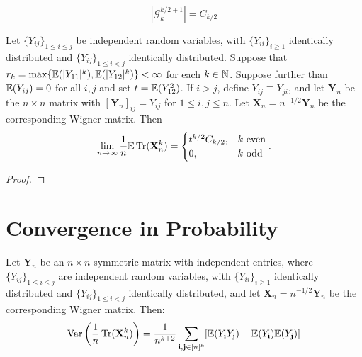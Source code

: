 \begin{proposition}
    \notready
    \label{prop:graph_Catalan_number}
  \[|\mathcal{G}^{k/2 + 1}_k| = C_{k/2}\]
\end{proposition}



%
%
%
%
%
%
%
%


\begin{proposition}
  \label{prop:matrix_moments_convergence}
  \notready
  Let $\{Y_{ij}\}_{1\le i\le j}$ be independent random variables, with $\{Y_{ii}\}_{i\ge 1}$ identically distributed and $\{Y_{ij}\}_{1\le i<j}$ identically distributed.  Suppose that $r_k = \max\{\mathbb{E}(|Y_{11}|^k),\mathbb{E}(|Y_{12}|^k)\} <\infty$ for each $k\in\mathbb{N}$.  Suppose further than $\mathbb{E}(Y_{ij})=0$ for all $i,j$ and set $t=\mathbb{E}(Y_{12}^2)$.  If $i>j$, define $Y_{ij} \equiv Y_{ji}$, and let $\mathbf{Y}_n$ be the $n\times n$ matrix with $[\mathbf{Y}_n]_{ij} = Y_{ij}$ for $1\le i,j\le n$.  Let $\mathbf{X}_n = n^{-1/2}\mathbf{Y}_n$ be the corresponding Wigner matrix.  Then
\[
\lim_{n\to\infty} \frac{1}{n}\mathbb{E}\operatorname{Tr}(\mathbf{X}_n^k) = \begin{cases}
  t^{k/2}C_{k/2}, & k\text{ even} \\
  0, & k\text{ odd}
\end{cases}.
\]
\end{proposition}

\begin{proof}
\notready
\end{proof}




\section{Convergence in Probability}


\begin{lemma}
    \label{lem:variance_expansion}
    \notready
    Let $\mathbf{Y}_{n}$ be an $n \times n$ symmetric matrix with independent entries, where $\{Y_{ij}\}_{1\le i\le j}$ are independent random variables, with $\{Y_{ii}\}_{i\ge 1}$ identically distributed and $\{Y_{ij}\}_{1\le i<j}$ identically distributed, and let $\mathbf{X}_{n} = n^{-1 / 2}\mathbf{Y}_{n}$ be the corresponding Wigner matrix. Then:
    $$
    \operatorname{Var}\left(\frac{1}{n}\operatorname{Tr}(\mathbf{X}_{n}^{k})\right) = \frac{1}{n^{k+2}} \sum_{\mathbf{i}, \mathbf{j} \in [n]^{k}} [\mathbb{E}(Y_{\mathbf{i}} Y_{\mathbf{j}}) - \mathbb{E}(Y_{\mathbf{i}})\mathbb{E}(Y_{\mathbf{j}})]
    $$ 
\end{lemma}

